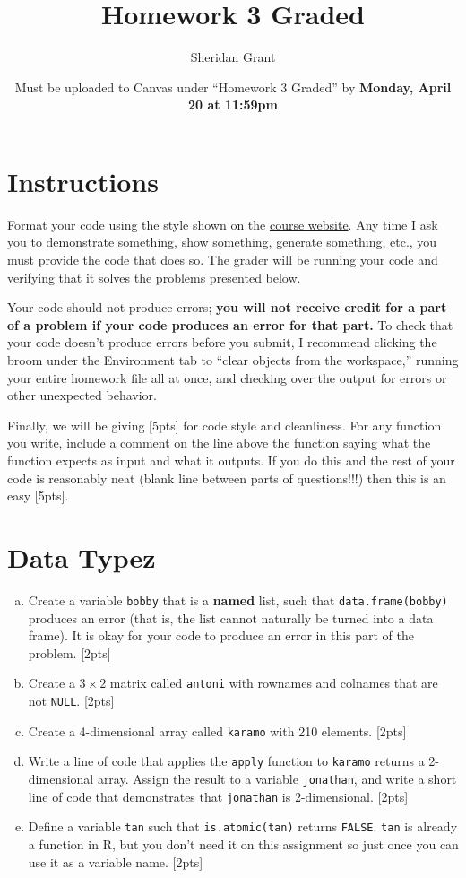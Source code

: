 \documentclass[12pt]{article}
\title{Homework 3 Graded}
\author{Sheridan Grant}
\date{Must be uploaded to Canvas under ``Homework 3 Graded'' by \textbf{Monday, April 20 at 11:59pm}}
\begin{document}
\sloppy

\maketitle

\section*{Instructions}

Format your code using the style shown on the \href{https://sheridanlgrant.github.io/teaching/STAT302_SPR2020}{course website}. Any time I ask you to demonstrate something, show something, generate something, etc., you must provide the code that does so. The grader will be running your code and verifying that it solves the problems presented below.

Your code should not produce errors; \textbf{you will not receive credit for a part of a problem if your code produces an error for that part.} To check that your code doesn't produce errors before you submit, I recommend clicking the broom under the Environment tab to ``clear objects from the workspace,'' running your entire homework file all at once, and checking over the output for errors or other unexpected behavior.

Finally, we will be giving [5pts] for code style and cleanliness. For any function you write, include a comment on the line above the function saying what the function expects as input and what it outputs. If you do this and the rest of your code is reasonably neat (blank line between parts of questions!!!) then this is an easy [5pts].

\section{Data Typez}

\begin{enumerate}[(a)]
	\item Create a variable \verb|bobby| that is a \textbf{named} list, such that \verb|data.frame(bobby)| produces an error (that is, the list cannot naturally be turned into a data frame). It is okay for your code to produce an error in this part of the problem. [2pts]
	\item Create a $3 \times 2$ matrix called \verb|antoni| with rownames and colnames that are not \verb|NULL|. [2pts]
	\item Create a 4-dimensional array called \verb|karamo| with 210 elements. [2pts]
	\item Write a line of code that applies the \verb|apply| function to \verb|karamo| returns a 2-dimensional array. Assign the result to a variable \verb|jonathan|, and write a short line of code that demonstrates that \verb|jonathan| is 2-dimensional. [2pts]
	\item Define a variable \verb|tan| such that \verb|is.atomic(tan)| returns \verb|FALSE|. \verb|tan| is already a function in R, but you don't need it on this assignment so just once you can use it as a variable name. [2pts]
	
\end{enumerate}
\end{document}
